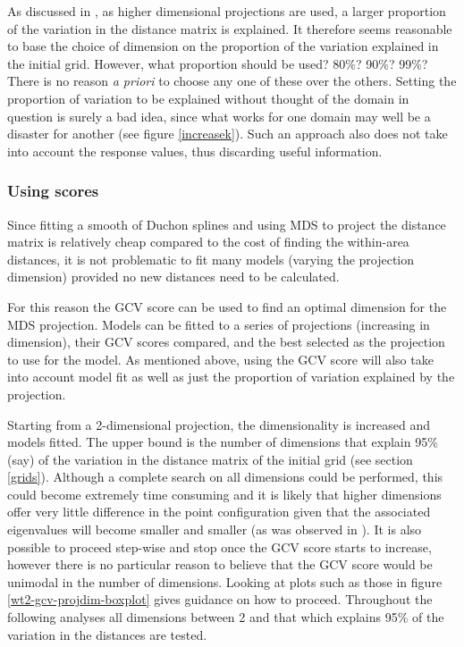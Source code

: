 As discussed in , as higher dimensional projections are used, a larger proportion of the variation in the distance matrix is explained. It therefore seems reasonable to base the choice of dimension on the proportion of the variation explained in the initial grid. However, what proportion should be used? 80\%? 90\%? 99\%? There is no reason \textit{a priori} to choose any one of these over the others. Setting the proportion of variation to be explained without thought of the domain in question is surely a bad idea, since what works for one domain may well be a disaster for another (see figure \ref{increasek}). Such an approach also does not take into account the response values, thus discarding useful information.

\subsubsection{Using scores}

Since fitting a smooth of Duchon splines and using MDS to project the distance matrix is relatively cheap compared to the cost of finding the within-area distances, it is not problematic to fit many models (varying the projection dimension) provided no new distances need to be calculated. 

For this reason the GCV score can be used to find an optimal dimension for the MDS projection. Models can be fitted to a series of projections (increasing in dimension), their GCV scores compared, and the best selected as the projection to use for the model. As mentioned above, using the GCV score will also take into account model fit as well as just the proportion of variation explained by the projection.

Starting from a 2-dimensional projection, the dimensionality is increased and models fitted. The upper bound is the number of dimensions that explain 95\% (say) of the variation in the distance matrix of the initial grid (see section \ref{grids}). Although a complete search on all dimensions could be performed, this could become extremely time consuming and it is likely that higher dimensions offer very little difference in the point configuration given that the associated eigenvalues will become smaller and smaller (as was observed in ). It is also possible to proceed step-wise and stop once the GCV score starts to increase, however there is no particular reason to believe that the GCV score would be unimodal in the number of dimensions. Looking at plots such as those in figure \ref{wt2-gcv-projdim-boxplot} gives guidance on how to proceed. Throughout the following analyses all dimensions between 2 and that which explains 95\% of the variation in the distances are tested.

